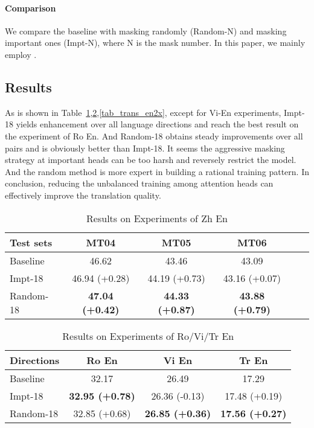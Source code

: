 \documentclass[11pt]{article}
\begin{document}
\paragraph{Comparison} We compare the baseline with masking randomly (Random-N) and masking important ones (Impt-N), where N is the mask number. In this paper, we mainly employ .




\subsection{Results} 
As is shown in Table~\ref{tab_trans_zh2en},\ref{tab_trans_x2en},\ref{tab_trans_en2x}, except for Vi-En experiments, Impt-18 yields enhancement over all language directions and reach the best result on the experiment of Ro  En. And Random-18 obtains steady improvements over all pairs and is obviously better than Impt-18. It seems the aggressive masking strategy at important heads can be too harsh and reversely restrict the model. And the random method is more expert in building a rational training pattern. In conclusion, reducing the unbalanced training among attention heads can effectively improve the translation quality.

\begin{table}[h]\footnotesize
    \centering
    \begin{tabular}{lccccc}
        \hline
        Test sets & MT04 & MT05 & MT06 \\ \hline
        Baseline & 46.62 & 43.46 & 43.09 \\
        Impt-18 & 46.94 (+0.28) & 44.19 (+0.73) & 43.16 (+0.07) \\
Random-18 & \textbf{47.04 (+0.42)} & \textbf{44.33 (+0.87)} & \textbf{43.88 (+0.79)} \\ \hline
\end{tabular}
    \caption{Results on Experiments of Zh  En}
    \label{tab_trans_zh2en}
\end{table}

\begin{table}[h]\footnotesize
    \centering
    \begin{tabular}{lccc}
        \hline
        Directions & Ro  En & Vi  En  & Tr  En \\ \hline
        Baseline & 32.17 & 26.49 & 17.29 \\
Impt-18 & \textbf{32.95 (+0.78)} & 26.36 (-0.13) & 17.48 (+0.19) \\
        Random-18 & 32.85 (+0.68) & \textbf{26.85 (+0.36)} & \textbf{17.56 (+0.27)} \\ \hline
\end{tabular}
    \caption{Results on Experiments of Ro/Vi/Tr  En}
    \label{tab_trans_x2en}
\end{table}
\end{document}
